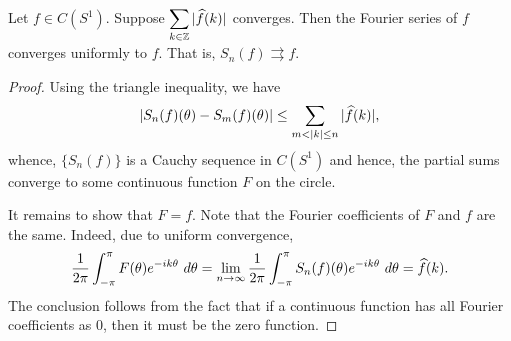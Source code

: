 \begin{proposition}
    Let $f\in C(S^1)$. Suppose $\displaystyle\sum_{k\in\mathbb{Z}}|\widehat{f}(k)|$ converges. Then the Fourier series of $f$ converges uniformly to $f$. That is, $S_n(f)\rightrightarrows f$.
\end{proposition}
\begin{proof}
    Using the triangle inequality, we have 
    \begin{equation*}
        |S_n(f)(\theta) - S_m(f)(\theta)|\le\sum_{m < |k|\le n}|\widehat{f}(k)|,
    \end{equation*}
    whence, $\{S_n(f)\}$ is a Cauchy sequence in $C(S^1)$ and hence, the partial sums converge to some continuous function $F$ on the circle.

    It remains to show that $F = f$. Note that the Fourier coefficients of $F$ and $f$ are the same. Indeed, due to uniform convergence, 
    \begin{equation*}
        \frac{1}{2\pi}\int_{-\pi}^\pi F(\theta)e^{-ik\theta}~d\theta = \lim_{n\to\infty}\frac{1}{2\pi}\int_{-\pi}^\pi S_n(f)(\theta)e^{-ik\theta}~d\theta = \widehat{f}(k).
    \end{equation*}
    The conclusion follows from the fact that if a continuous function has all Fourier coefficients as $0$, then it must be the zero function.
\end{proof}